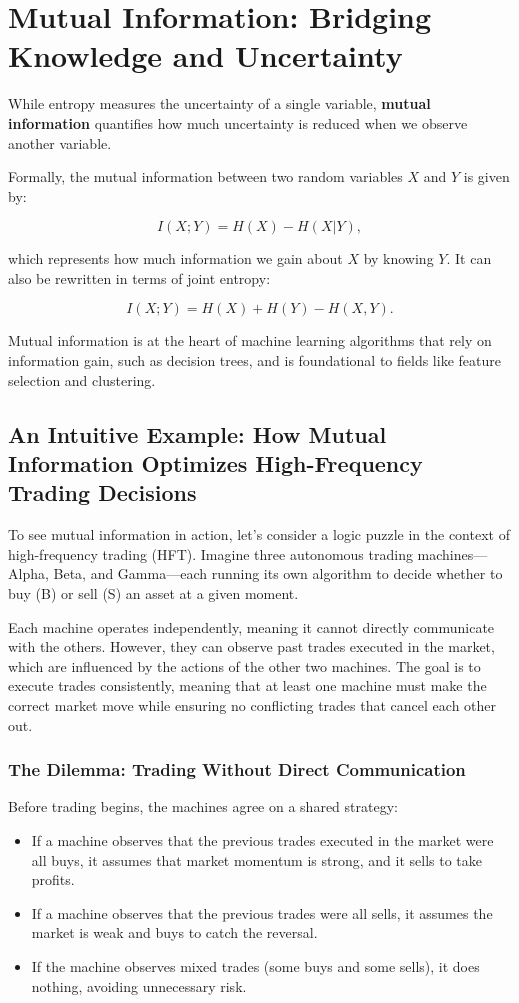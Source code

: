 \section{Mutual Information: Bridging Knowledge and Uncertainty}

While entropy measures the uncertainty of a single variable, \textbf{mutual information} quantifies how much uncertainty is reduced when we observe another variable.

Formally, the mutual information between two random variables \(X\) and \(Y\) is given by:

\[
I(X; Y) = H(X) - H(X | Y),
\]

which represents how much information we gain about \(X\) by knowing \(Y\). It can also be rewritten in terms of joint entropy:

\[
I(X; Y) = H(X) + H(Y) - H(X, Y).
\]

Mutual information is at the heart of machine learning algorithms that rely on information gain, such as decision trees, and is foundational to fields like feature selection and clustering.

\subsection{An Intuitive Example: How Mutual Information Optimizes High-Frequency Trading Decisions}

To see mutual information in action, let’s consider a logic puzzle in the context of high-frequency trading (HFT). Imagine three autonomous trading machines—Alpha, Beta, and Gamma—each running its own algorithm to decide whether to buy (B) or sell (S) an asset at a given moment.  

Each machine operates independently, meaning it cannot directly communicate with the others. However, they can observe past trades executed in the market, which are influenced by the actions of the other two machines. The goal is to execute trades consistently, meaning that at least one machine must make the correct market move while ensuring no conflicting trades that cancel each other out.  

\subsubsection*{The Dilemma: Trading Without Direct Communication}  

Before trading begins, the machines agree on a shared strategy:  

\begin{itemize}
    \item If a machine observes that the previous trades executed in the market were all buys, it assumes that market momentum is strong, and it sells to take profits.  
    \item If a machine observes that the previous trades were all sells, it assumes the market is weak and buys to catch the reversal.  
    \item If the machine observes mixed trades (some buys and some sells), it does nothing, avoiding unnecessary risk.  
\end{itemize}

